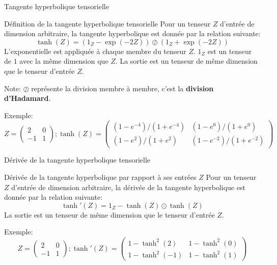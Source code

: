 \begin{frame}{Tangente hyperbolique tensorielle}
	\begin{block}{Définition de la tangente hyperbolique tensorielle}
		Pour un tenseur $Z$ d'entrée de dimension arbitraire, la tangente hyperbolique est donnée par la relation suivante:
		\begin{equation*}
			\tanh(Z) = \left(1_Z - \exp{(-2 Z)}\right) \oslash \left(1_Z + \exp{(-2 Z)}\right)
		\end{equation*}
		L'exponentielle est appliquée à chaque membre du tenseur $Z$. $1_Z$ est un tenseur de $1$ avec la même dimension que $Z$. La sortie est un tenseur de même dimension que le tenseur d'entrée $Z$.
	\end{block}
	Note: $\oslash$ représente la division membre à membre, c'est la \textbf{division d'Hadamard}.
	
	Exemple:
	\begin{equation*}
		Z = \begin{pmatrix}
			2 & 0 \\
			-1 & 1 
		\end{pmatrix}; 
		\tanh(Z) = \begin{pmatrix}
			(1 - e^{-4}) / (1 + e^{-4}) & (1 - e^{0}) / (1 + e^{0}) \\
			(1 - e^{2}) / (1 + e^{2}) & (1 - e^{-2}) / (1 + e^{-2})
		\end{pmatrix}
	\end{equation*}	
\end{frame}

\begin{frame}{Dérivée de la tangente hyperbolique tensorielle}

	\begin{block}{Dérivée de la tangente hyperbolique par rapport à ses entrées $Z$}
		Pour un tenseur $Z$ d'entrée de dimension arbitraire, la dérivée de la tangente hyperbolique est donnée par la relation suivante:
		\begin{equation*}
			\tanh'(Z) = 1_Z - \tanh{(Z)} \odot \tanh{(Z)}
		\end{equation*}
		La sortie est un tenseur de même dimension que le tenseur d'entrée $Z$.		
	\end{block}
	Exemple:
	\begin{equation*}
		Z = \begin{pmatrix}
			2 & 0 \\
			-1 & 1 
		\end{pmatrix}; 
		\tanh'(Z) = \begin{pmatrix}
			1 - \tanh^2{(2)}  & 1 - \tanh^2{(0)} \\
			1 - \tanh^2{(-1)} & 1 - \tanh^2{(1)}
		\end{pmatrix}
	\end{equation*}	
\end{frame}

